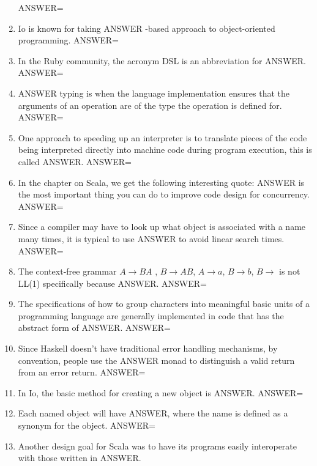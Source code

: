 \documentclass{exam}
\begin{document}
\begin{enumerate}
ANSWER=
\item Io is known for taking ANSWER -based approach to object-oriented programming.\newline
ANSWER=
\item In the Ruby community, the acronym DSL is an abbreviation for ANSWER.\newline
ANSWER=
\item ANSWER typing is when the language implementation ensures that the arguments of an operation are of the type the operation is defined for.\newline
ANSWER=
\item One approach to speeding up an interpreter is to translate pieces of the code being interpreted directly into machine code during program execution, this is called ANSWER.\newline
ANSWER=
\item In the chapter on Scala, we get the following interesting quote: ANSWER is the most important thing you can do to improve code design for concurrency.\newline
ANSWER=
\item Since a compiler may have to look up what object is associated with a name many times, it is typical to use ANSWER to avoid linear search times.\newline
ANSWER=
\item The context-free grammar $A \rightarrow B A$ , $B \rightarrow A B$, $A \rightarrow a$, $B \rightarrow b$, $B \rightarrow$  is not LL(1) specifically because ANSWER.\newline
ANSWER=
\item The specifications of how to group characters into meaningful basic units of a programming language are generally implemented in code that has the abstract form of ANSWER.\newline
ANSWER=
\item Since Haskell doesn't have traditional error handling mechanisms, by convention, people use the ANSWER monad to distinguish a valid return from an error return.\newline
ANSWER=
\item In Io, the basic method for creating a new object is ANSWER.\newline
ANSWER=
\item Each named object will have ANSWER, where the name is defined as a synonym for the object.\newline
ANSWER=
\item Another design goal for Scala was to have its programs easily interoperate with those written in ANSWER.\newline

\end{enumerate}
\end{document}
